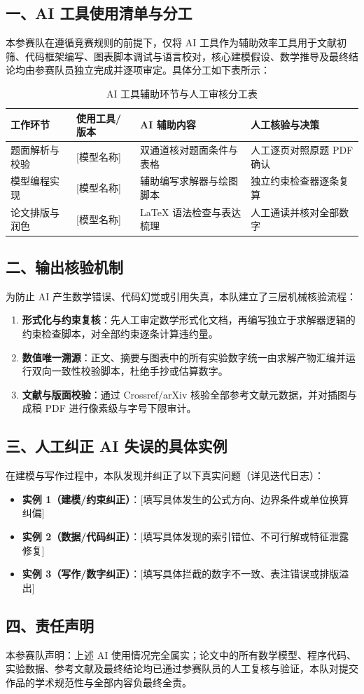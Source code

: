 
\subsection*{一、AI 工具使用清单与分工}
本参赛队在遵循竞赛规则的前提下，仅将 AI 工具作为辅助效率工具用于文献初筛、代码框架编写、图表脚本调试与语言校对，核心建模假设、数学推导及最终结论均由参赛队员独立完成并逐项审定。具体分工如下表所示：

\begin{table}[H]
\centering
\caption{AI 工具辅助环节与人工审核分工表}
\begin{tabular}{p{3cm}p{4cm}p{4cm}p{3.5cm}}
\toprule
工作环节 & 使用工具/版本 & AI 辅助内容 & 人工核验与决策 \\
\midrule
题面解析与校验 & [模型名称] & 双通道核对题面条件与表格 & 人工逐页对照原题 PDF 确认 \\
模型编程实现 & [模型名称] & 辅助编写求解器与绘图脚本 & 独立约束检查器逐条复算 \\
论文排版与润色 & [模型名称] & LaTeX 语法检查与表达梳理 & 人工通读并核对全部数字 \\
\bottomrule
\end{tabular}
\end{table}

\subsection*{二、输出核验机制}
为防止 AI 产生数学错误、代码幻觉或引用失真，本队建立了三层机械核验流程：
\begin{enumerate}
  \item \textbf{形式化与约束复核}：先人工审定数学形式化文档，再编写独立于求解器逻辑的约束检查脚本，对全部约束逐条计算违约量。
  \item \textbf{数值唯一溯源}：正文、摘要与图表中的所有实验数字统一由求解产物汇编并运行双向一致性校验脚本，杜绝手抄或估算数字。
  \item \textbf{文献与版面校验}：通过 Crossref/arXiv 核验全部参考文献元数据，并对插图与成稿 PDF 进行像素级与字号下限审计。
\end{enumerate}

\subsection*{三、人工纠正 AI 失误的具体实例}
在建模与写作过程中，本队发现并纠正了以下真实问题（详见迭代日志）：
\begin{itemize}
  \item \textbf{实例 1（建模/约束纠正）}：[填写具体发生的公式方向、边界条件或单位换算纠偏]
  \item \textbf{实例 2（数据/代码纠正）}：[填写具体发现的索引错位、不可行解或特征泄露修复]
  \item \textbf{实例 3（写作/数字纠正）}：[填写具体拦截的数字不一致、表注错误或排版溢出]
\end{itemize}

\subsection*{四、责任声明}
本参赛队声明：上述 AI 使用情况完全属实；论文中的所有数学模型、程序代码、实验数据、参考文献及最终结论均已通过参赛队员的人工复核与验证，本队对提交作品的学术规范性与全部内容负最终全责。
